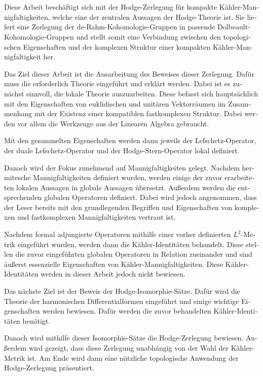 \section{}
\begin{otherlanguage}{ngerman}
Diese Arbeit beschäftigt sich mit der Hodge-Zerlegung für kompakte Kähler-Mannigfaltigkeiten,
welche eine der zentralen Aussagen der Hodge-Theorie ist. Sie liefert eine Zerlegung der
de-Rahm-Kohomologie-Gruppen in passende Dolbeault-Kohomologie-Gruppen und stellt somit eine
Verbindung zwischen den topologischen Eigenschaften und der komplexen Struktur einer kompakten
Kähler-Mannigfaltigkeit her.

Das Ziel dieser Arbeit ist die Ausarbeitung des Beweises dieser Zerlegung. Dafür muss die
erforderlich Theorie eingeführt und erklärt werden. Dabei ist es zunächst sinnvoll, die lokale
Theorie auszuarbeiten. Diese befasst sich hauptsächlich mit den Eigenschaften von euklidischen und
unitären Vektorräumen im Zusammenhang mit der Existenz einer kompatiblen fastkomplexen Struktur.
Dabei werden vor allem die Werkzeuge aus der Linearen Algebra gebraucht.

Mit den gesammelten Eigenschaften werden dann jeweils der Lefschetz-Operator, der duale
Lefschetz-Operator und der Hodge-Stern-Operator lokal definiert.

Danach wird der Fokus zunehmend auf Mannigfaltigkeiten gelegt. Nachdem hermitesche
Mannigfaltigkeiten definiert wurden, werden einige der zuvor erarbeiteten lokalen Aussagen in
globale Aussagen übersetzt. Außerdem werden die entsprechenden globalen Operatoren definiert. Dabei
wird jedoch angenommen, dass der Leser bereits mit den grundlegenden Begriffen und Eigenschaften von
komplexen und fastkomplexen Mannigfaltigkeiten vertraut ist.

Nachdem formal adjungierte Operatoren mithilfe einer vorher definierten $L^2$-Metrik eingeführt
wurden, werden dann die Kähler-Identitäten behandelt. Diese stellen die zuvor eingeführten globalen
Operatoren in Relation zueinander und sind äußerst essenzielle Eigenschaften von
Kähler-Mannigfaltigkeiten. Diese Kähler-Identitäten werden in dieser Arbeit jedoch nicht bewiesen.

Das nächste Ziel ist der Beweis der Hodge-Isomorphie-Sätze. Dafür wird die Theorie der harmonischen
Differentialformen eingeführt und einige wichtige Eigenschaften werden bewiesen. Dafür werden die
zuvor behandelten Kähler-Identitäten benötigt.

Danach wird mithilfe dieser Isomorphie-Sätze die Hodge-Zerlegung bewiesen. Außerdem wird gezeigt,
dass diese Zerlegung unabhängig von der Wahl der Kähler-Metrik ist. Am Ende wird dann eine nützliche
topologische Anwendung der Hodge-Zerlegung präsentiert.
\end{otherlanguage}
